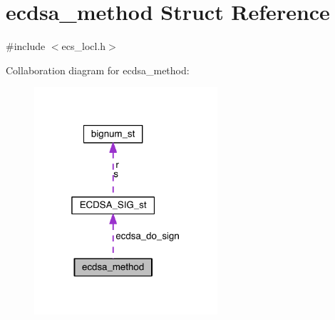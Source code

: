 \hypertarget{structecdsa__method}{}\section{ecdsa\+\_\+method Struct Reference}
\label{structecdsa__method}


{\ttfamily \#include $<$ecs\+\_\+locl.\+h$>$}



Collaboration diagram for ecdsa\+\_\+method\+:\nopagebreak
\begin{figure}[H]
\begin{center}
\leavevmode
\includegraphics[width=193pt]{structecdsa__method__coll__graph}
\end{center}
\end{figure}
